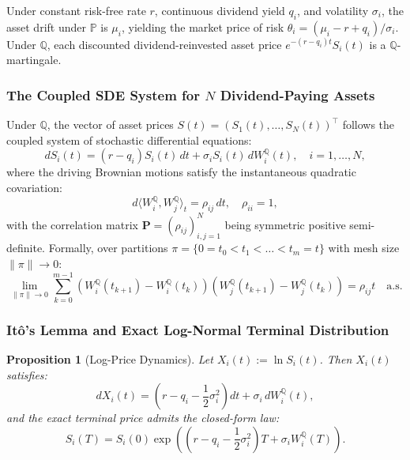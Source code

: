 \documentclass{article}
\theoremstyle{plain}
\newtheorem{proposition}[theorem]{Proposition}
\theoremstyle{definition}
\theoremstyle{remark}
\begin{document}
Under constant risk-free rate $r$, continuous dividend yield $q_i$, and volatility $\sigma_i$, the asset drift under $\mathbb{P}$ is $\mu_i$, yielding the market price of risk $\theta_i = (\mu_i - r + q_i)/\sigma_i$. Under $\mathbb{Q}$, each discounted dividend-reinvested asset price $e^{-(r - q_i)t}S_i(t)$ is a $\mathbb{Q}$-martingale.

\subsubsection{The Coupled SDE System for \texorpdfstring{$N$}{N} Dividend-Paying Assets}
Under $\mathbb{Q}$, the vector of asset prices $S(t) = (S_1(t), \dots, S_N(t))^\top$ follows the coupled system of stochastic differential equations:
\begin{equation}
dS_i(t) = (r - q_i)S_i(t)\,dt + \sigma_i S_i(t)\,dW_i^{\mathbb{Q}}(t), \quad i = 1, \dots, N,
\end{equation}
where the driving Brownian motions satisfy the instantaneous quadratic covariation:
\begin{equation}
d\langle W_i^{\mathbb{Q}}, W_j^{\mathbb{Q}}\rangle_t = \rho_{ij}\,dt, \quad \rho_{ii} = 1,
\end{equation}
with the correlation matrix $\mathbf{P} = (\rho_{ij})_{i,j=1}^N$ being symmetric positive semi-definite. Formally, over partitions $\pi = \{0 = t_0 < t_1 < \dots < t_m = t\}$ with mesh size $\|\pi\| \to 0$:
\begin{equation}
\lim_{\|\pi\|\to 0}\sum_{k=0}^{m-1}\left(W_i^{\mathbb{Q}}(t_{k+1})-W_i^{\mathbb{Q}}(t_k)\right)\left(W_j^{\mathbb{Q}}(t_{k+1})-W_j^{\mathbb{Q}}(t_k)\right) = \rho_{ij}t \quad \text{a.s.}
\end{equation}

\subsubsection{It\^o's Lemma and Exact Log-Normal Terminal Distribution}
\begin{proposition}[Log-Price Dynamics]
Let $X_i(t) := \ln S_i(t)$. Then $X_i(t)$ satisfies:
\begin{equation}
dX_i(t) = \left(r - q_i - \frac{1}{2}\sigma_i^2\right)dt + \sigma_i\,dW_i^{\mathbb{Q}}(t),
\end{equation}
and the exact terminal price admits the closed-form law:
\begin{equation}
S_i(T) = S_i(0)\exp\left(\left(r - q_i - \frac{1}{2}\sigma_i^2\right)T + \sigma_i W_i^{\mathbb{Q}}(T)\right).
\end{equation}
\end{proposition}
\end{document}
